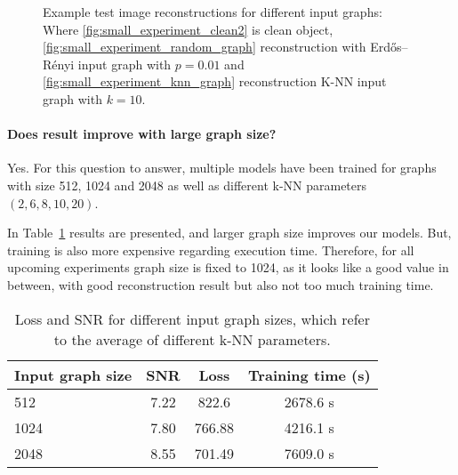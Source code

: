   \begin{figure}[H]
    \label{fig:input_graph_small}
    \hfill
    \hfill
    \hfill
    \hfill
	\caption{Example test image reconstructions for different input graphs:\\
  Where \ref{fig:small_experiment_clean2} is clean object, 
  \ref{fig:small_experiment_random_graph} reconstruction with  Erdős–Rényi input graph with $p=0.01$ and 
  \ref{fig:small_experiment_knn_graph} reconstruction K-NN input graph with $k=10$.
  }
\end{figure}


  \paragraph{Does result improve with large graph size?}
  Yes.
  For this question to answer, multiple models have been trained for graphs with size 512, 1024 and 2048 
  as well as different k-NN parameters $(2,6,8,10,20)$.

  In Table~\ref{tab:graph_knn} results are presented, and larger graph size improves our models. 
  But, training is also more expensive regarding execution time. 
  Therefore, for all upcoming experiments graph size is fixed to 1024, as it looks like a good
  value in between, with good reconstruction result but also not too much training time.
  
  \begin{table}[H]
    \centering
      \begin{tabular}{l|ccc}
      \toprule
      \textbf{Input graph size} & \textbf{SNR} & \textbf{Loss} & \textbf{Training time (s)}  \\ 
      \midrule
      512  &  7.22    &  822.6  & 2678.6 s \\ \hline
      1024 &  7.80    &  766.88 & 4216.1 s \\ \hline
      2048 &  8.55    &  701.49 & 7609.0 s  \\ \hline
      \midrule
      \end{tabular}
    \caption{Loss and SNR for different input graph sizes, which refer to the average of different k-NN parameters.}
    \label{tab:graph_knn}
  \end{table}

